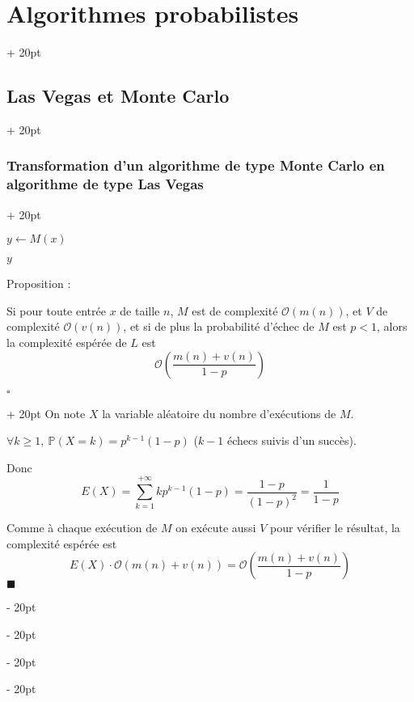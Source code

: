 \documentclass[a4paper, 12pt, twoside]{article}
\newenvironment{indalgo}[2][H]{
    \begin{algoBox}
        \begin{algorithm}[#1]
            \caption{#2}
}
{
        \end{algorithm}
    \end{algoBox}
}
\newcommand{\lr}[1]{\left( #1 \right)}
\renewcommand{\ge}{\geqslant}
\newcommand{\ind}[1][20pt]{\advance\leftskip + #1}
\newcommand{\deind}[1][20pt]{\advance\leftskip - #1}
\newenvironment{indt}[2][20pt]{#2 \par \ind[#1]}{\par \deind} %
\newenvironment{proof}[1][{}]{\begin{indt}{$\square$ #1}}{$\blacksquare$ \end{indt}}
\newcommand{\1}{\mathbbm 1}
\begin{document}
\begin{indt}{\section{Algorithmes probabilistes}}
\begin{indt}{\subsection{Las Vegas et Monte Carlo}}
\begin{indt}{\subsubsection{Transformation d'un algorithme de type Monte Carlo en algorithme de type Las Vegas}}
\begin{indalgo}{$L$, algorithme Las Vegas associé à l'algorithme Monte Carlo $M$}
                    $y \gets M(x)$\;


                    \Return $y$\;
                \end{indalgo}

                \vspace{6pt}
                
                Proposition :
                \begin{emphBox}
                    Si pour toute entrée $x$ de taille $n$, $M$ est de complexité $\mathcal O(m(n))$, et $V$ de complexité $\mathcal O(v(n))$, et si de plus la probabilité d'échec de $M$ est $p < 1$, alors la complexité espérée de $L$ est
                    \[
                        \mathcal O\!\lr{\dfrac{m(n) + v(n)}{1 - p}}
                    \]
                \end{emphBox}

                \vspace{6pt}
                
                \begin{proof}
                    On note $X$ la variable aléatoire du nombre d'exécutions de $M$.

                    $\forall k \ge 1,\ \mathbb P(X = k) = p^{k - 1}(1 - p)$ ($k - 1$ échecs suivis d'un succès).

                    Donc
                    \[
                        E(X) = \sum_{k = 1}^{+\infty} k p^{k - 1} (1 - p)
                        = \dfrac{1 - p}{(1 - p)^2}
                        = \dfrac{1}{1 - p}
                    \]

                    Comme à chaque exécution de $M$ on exécute aussi $V$ pour vérifier le résultat, la complexité espérée est
                    \[
                        E(X) \cdot \mathcal O\!\lr{m(n) + v(n)}
                        = \mathcal O\!\lr{\dfrac{m(n) + v(n)}{1 - p}}
                    \]
                \end{proof}
            \end{indt}
        \end{indt}
    \end{indt}
    
\end{document}
